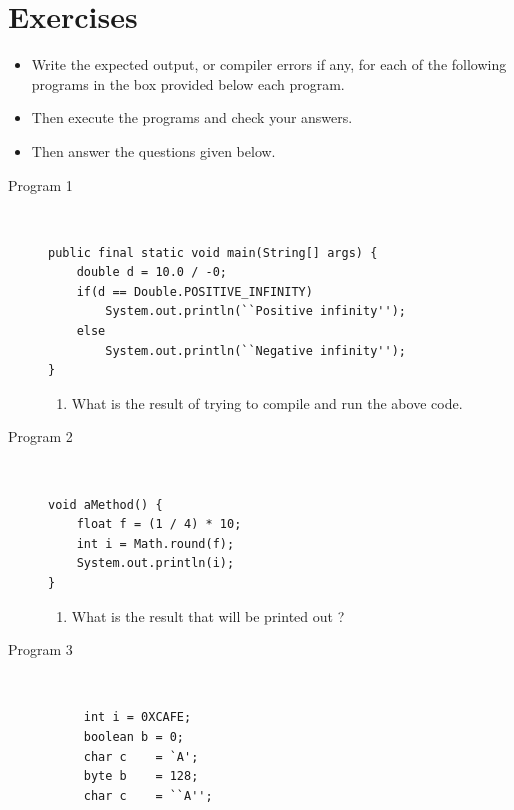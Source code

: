 \documentclass[11pt,a4paper]{article}
\def\AnswerBox{\fbox{\begin{minipage}{4in}\hfill\vspace{0.5in}\end{minipage}}}
\begin{document}
\section*{Exercises}
\begin{itemize}
    \item Write the expected output, or compiler errors if any, for each of the following programs in the box provided below each program.
    \item Then execute the programs and check your answers.
    \item Then answer the questions given below.
\end{itemize}
\begin{description}
\item [Program 1]\
\begin{lstlisting}
public final static void main(String[] args) {
    double d = 10.0 / -0;
    if(d == Double.POSITIVE_INFINITY)
        System.out.println(``Positive infinity'');
    else
        System.out.println(``Negative infinity'');
}

\end{lstlisting}

\AnswerBox

\begin{enumerate}[label=\bfseries Q\arabic*:]\itemsep10pt
\item What is the result of trying to compile and run the above code.
\end{enumerate}

\item [Program 2]\
\begin{lstlisting}
void aMethod() {
    float f = (1 / 4) * 10;
    int i = Math.round(f);
    System.out.println(i);
}
\end{lstlisting}

\AnswerBox

\begin{enumerate}[label=\bfseries Q\arabic*:]\itemsep10pt
        \item What is the result that will be printed out ?
    \end{enumerate}


\item [Program 3]\
    \begin{lstlisting}
     int i = 0XCAFE;
     boolean b = 0;
     char c    = `A';
     byte b    = 128;
     char c    = ``A'';
     \end{lstlisting}

\AnswerBox


\end{description}
\end{document}
